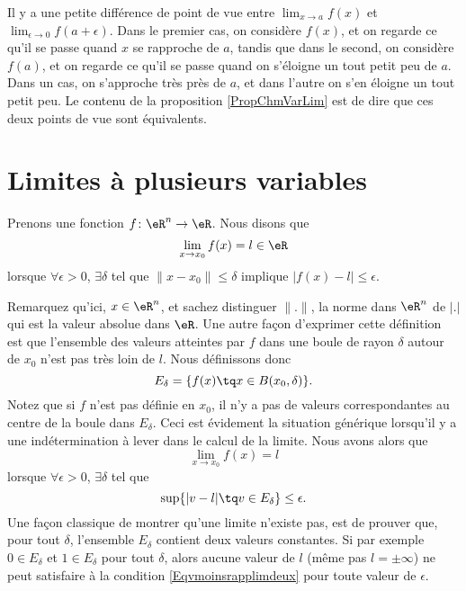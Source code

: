 Il y a une petite différence de point de vue entre $\lim_{x\to a}f(x)$ et $\lim_{\epsilon\to 0}f(a+\epsilon)$. Dans le premier cas, on considère $f(x)$, et on regarde ce qu'il se passe quand $x$ se rapproche de $a$, tandis que dans le second, on considère $f(a)$, et on regarde ce qu'il se passe quand on s'éloigne un tout petit peu de $a$. Dans un cas, on s'approche très près de $a$, et dans l'autre on s'en éloigne un tout petit peu. Le contenu de la proposition \ref{PropChmVarLim} est de dire que ces deux points de vue sont équivalents.


\section{Limites à plusieurs variables}
\label{SecLimVarsPlus}

Prenons une fonction $f\colon \eR^n\to \eR$. Nous disons que
\begin{equation}
    \lim_{x\to x_0}f(x)=l\in\eR
\end{equation}
lorsque $\forall \epsilon>0$, $\exists\delta$ tel que $\| x-x_0 \|\leq\delta$ implique $| f(x)-l |\leq \epsilon$. 

Remarquez qu'ici, $x\in\eR^n$, et sachez distinguer $\| . \|$, la norme dans $\eR^n$ de $| . |$ qui est la valeur absolue dans $\eR$. Une autre façon d'exprimer cette définition est que l'ensemble des valeurs atteintes par $f$ dans une boule de rayon $\delta$ autour de $x_0$ n'est pas très loin de $l$. Nous définissons donc
\begin{equation}
    E_{\delta}=\{ f(x)\tq x\in B(x_0,\delta) \}.
\end{equation}
Notez que si $f$ n'est pas définie en $x_0$, il n'y a pas de valeurs correspondantes au centre de la boule dans $E_{\delta}$. Ceci est évidement la situation générique lorsqu'il y a une indétermination à lever dans le calcul de la limite. Nous avons alors que
\begin{equation}
    \lim_{x\to x_0}f(x)=l
\end{equation}
lorsque $\forall\epsilon>0$, $\exists\delta$ tel que 
\begin{equation}        \label{Eqvmoinsrapplimdeux}
    \sup\{ | v-l |\tq v\in E_{\delta} \}\leq\epsilon.
\end{equation}
Une façon classique de montrer qu'une limite n'existe pas, est de prouver que, pour tout $\delta$, l'ensemble $E_{\delta}$ contient deux valeurs constantes. Si par exemple $0\in E_{\delta}$ et $1\in E_{\delta}$ pour tout $\delta$, alors aucune valeur de $l$ (même pas $l=\pm\infty$) ne peut satisfaire à la condition \eqref{Eqvmoinsrapplimdeux} pour toute valeur de $\epsilon$.

